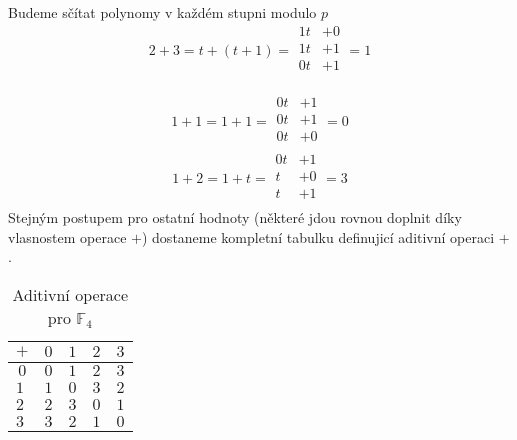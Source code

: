 \begin{example}
Budeme sčítat polynomy v každém stupni modulo $p$
\[
2 + 3 = t + (t + 1)
=
\begin{array}{rr}
    1t & + 0\\
    1t & + 1\\ \hline
    0t & + 1\\
      &
\end{array}
= 1
\]

\[
1 + 1 = 1 + 1
=
\begin{array}{rr}
    0t & + 1\\
    0t & + 1\\ \hline
    0t & + 0\\
       &
\end{array}
= 0
\]
\[
    1 + 2 = 1 + t
=
\begin{array}{rr}
    0t & + 1\\
    t  & + 0\\ \hline
    t  & + 1\\
       &
\end{array}
= 3
\]
Stejným postupem pro ostatní hodnoty (některé jdou rovnou doplnit díky vlasnostem operace $+$)
dostaneme kompletní tabulku definujicí aditivní operaci $+$.

\begin{table}[h]
    \centering
    \begin{tabular}{|l|l|l|l|l|}
    \hline
    \multicolumn{1}{|c|}{$+$} & \multicolumn{1}{c|}{$0$} & \multicolumn{1}{c|}{$1$} & \multicolumn{1}{c|}{$2$} & \multicolumn{1}{c|}{$3$} \\ \hline
    \multicolumn{1}{|c|}{$0$} & \multicolumn{1}{c|}{$0$} & \multicolumn{1}{c|}{$1$} & \multicolumn{1}{c|}{$2$} & \multicolumn{1}{c|}{$3$} \\ \hline
    $1$                       & $1$                      & $0$                      & $3$                      & $2$                      \\ \hline
    $2$                       & $2$                      & $3$                      & $0$                      & $1$                      \\ \hline
    $3$                       & $3$                      & $2$                      & $1$                      & $0$                      \\ \hline
    \end{tabular}
    \caption{Aditivní operace pro $\mathbb{F}_{4}$}
    \label{tab:F4_plus}
    \end{table}

\end{example}

